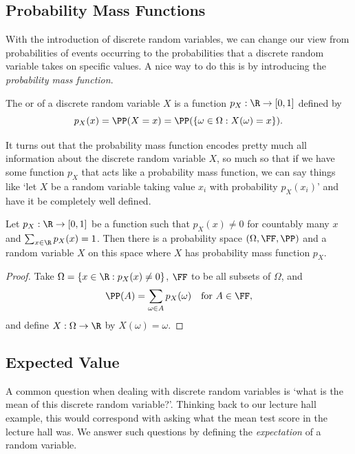 
\subsection{Probability Mass Functions}

With the introduction of discrete random variables, we can change our view from probabilities of events occurring to the probabilities that a discrete random variable takes on specific values. A nice way to do this is by introducing the \emph{probability mass function}.

\begin{definition}
	The  or  of a discrete random variable $X$ is a function $p_X: \R \rightarrow [0, 1]$ defined by
	$$
	p_X(x) = \PP(X = x) = \PP(\{ \omega \in \Omega : X(\omega) = x\}).
	$$
\end{definition}

It turns out that the probability mass function encodes pretty much all information about the discrete random variable $X$, so much so that if we have some function $p_X$ that acts like a probability mass function, we can say things like `let $X$ be a random variable taking value $x_i$ with probability $p_X(x_i)$' and have it be completely well defined.

\begin{theorem}
	Let $p_X : \R \rightarrow [0, 1]$ be a function such that $p_X(x) \neq 0$ for countably many $x$ and $\sum_{x \in \R} p_X(x) = 1$. Then there is a probability space $(\Omega, \FF, \PP)$ and a random variable $X$ on this space where $X$ has probability mass function $p_X$.
\end{theorem}
\begin{proof}
	Take $\Omega = \{x \in \R : p_X(x) \neq 0\}$, $\FF$ to be all subsets of $\Omega$, and 
	$$
	\PP(A) = \sum_{\omega \in A} p_X(\omega) \quad \text{for }A \in \FF,
	$$
	and define $X : \Omega \rightarrow \R$ by $X(\omega) = \omega$.
\end{proof}


\subsection{Expected Value}

A common question when dealing with discrete random variables is `what is the mean of this discrete random variable?'. Thinking back to our 
lecture hall example, this would correspond with asking what the mean test score in the lecture hall was.
We answer such questions by defining the \emph{expectation} of a random variable.

